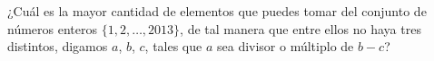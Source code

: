 ¿Cuál es la mayor cantidad de elementos que puedes tomar del conjunto de números enteros $\{1, 2, \dots , 2013\}$, de tal manera que entre ellos no haya tres distintos, digamos $a$, $b$, $c$, tales que $a$ sea divisor o múltiplo de $b − c$?